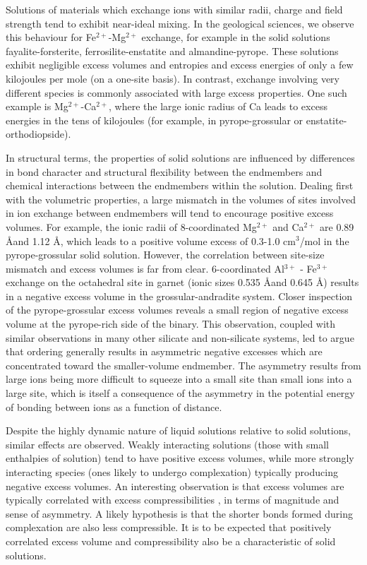 Solutions of materials which exchange ions with similar radii, charge and field strength tend to exhibit near-ideal mixing. In the geological sciences, we observe this behaviour for Fe$^{2+}$-Mg$^{2+}$ exchange, for example in the solid solutions fayalite-forsterite, ferrosilite-enstatite and almandine-pyrope. These solutions exhibit negligible excess volumes and entropies and excess energies of only a few kilojoules per mole (on a one-site basis). In contrast, exchange involving very different species is commonly associated with large excess properties. One such example is Mg$^{2+}$-Ca$^{2+}$, where the large ionic radius of Ca leads to excess energies in the tens of kilojoules (for example, in pyrope-grossular or enstatite-orthodiopside). 

In structural terms, the properties of solid solutions are influenced by differences in bond character and structural flexibility between the endmembers and chemical interactions between the endmembers within the solution. Dealing first with the volumetric properties, a large mismatch in the volumes of sites involved in ion exchange between endmembers will tend to encourage positive excess volumes. For example, the ionic radii of 8-coordinated Mg$^{2+}$ and Ca$^{2+}$ are 0.89 \AA and 1.12 \AA \citep{Shannon1976}, which leads to a positive volume excess of 0.3-1.0 cm$^3$/mol in the pyrope-grossular solid solution. However, the correlation between site-size mismatch and excess volumes is far from clear. 6-coordinated Al$^{3+}$ - Fe$^{3+}$ exchange on the octahedral site in garnet (ionic sizes 0.535 \AA and 0.645 \AA) results in a negative excess volume in the grossular-andradite system. Closer inspection of the pyrope-grossular excess volumes reveals a small region of negative excess volume at the pyrope-rich side of the binary. This observation, coupled with similar observations in many other silicate and non-silicate systems, led \cite{NW1980} to argue that ordering generally results in asymmetric negative excesses which are concentrated toward the smaller-volume endmember. The asymmetry results from large ions being more difficult to squeeze into a small site than small ions into a large site, which is itself a consequence of the asymmetry in the potential energy of bonding between ions as a function of distance.

Despite the highly dynamic nature of liquid solutions relative to solid solutions, similar effects are observed. Weakly interacting solutions (those with small enthalpies of solution) tend to have positive excess volumes, while more strongly interacting species (ones likely to undergo complexation) typically producing negative excess volumes. An interesting observation is that excess volumes are typically correlated with excess compressibilities \citep{FM1965}, in terms of magnitude and sense of asymmetry. A likely hypothesis is that the shorter bonds formed during complexation are also less compressible. It is to be expected that positively correlated excess volume and compressibility also be a characteristic of solid solutions. 

